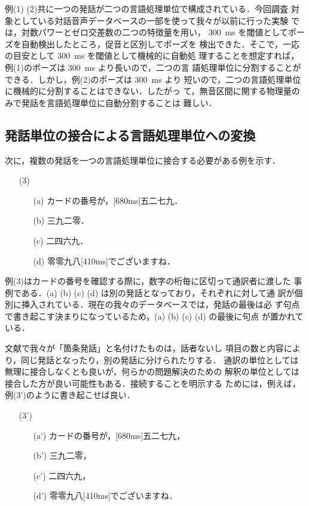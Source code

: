 例(1) (2)共に一つの発話が二つの言語処理単位で構成されている．今回調査
対象としている対話音声データベースの一部を使って我々が以前に行った実験
\cite{Takezawa96}では，対数パワーとゼロ交差数の二つの特徴量を用い，
300~ms を閾値としてポーズを自動検出したところ，促音と区別してポーズを
検出できた．そこで，一応の目安として 300~ms を閾値として機械的に自動処
理することを想定すれば，例(1)のポーズは 300~ms より長いので，二つの言
語処理単位に分割することができる．しかし，例(2)のポーズは 300~ms より
短いので，二つの言語処理単位に機械的に分割することはできない．したがっ
て，無音区間に関する物理量のみで発話を言語処理単位に自動分割することは
難しい．

\subsection{発話単位の接合による言語処理単位への変換}

次に，複数の発話を一つの言語処理単位に接合する必要がある例を示す．

\begin{itemize}
\item[(3)] 
\begin{itemize}
\item[(a)] カードの番号が，[680ms]五二七九．
\item[(b)] 三九二零．
\item[(c)] 二四六九．
\item[(d)] 零零九八[410ms]でございますね．
\end{itemize}
\end{itemize}

例(3)はカードの番号を確認する際に，数字の桁毎に区切って通訳者に渡した
事例である．(a) (b) (c) (d) は別の発話となっており，それぞれに対して通
訳が個別に挿入されている．現在の我々のデータベースでは，発話の最後は必
ず句点で書き起こす決まりになっているため，(a) (b) (c) (d) の最後に句点
が置かれている．

文献\cite{Takezawa95}で我々が「箇条発話」と名付けたものは，話者ないし
項目の数と内容により，同じ発話となったり，別の発話に分けられたりする．
通訳の単位としては無理に接合しなくとも良いが，何らかの問題解決のための
解釈の単位としては接合した方が良い可能性もある．接続することを明示する
ためには，例えば，例(3')のように書き起こせば良い．

\begin{itemize}
\item[(3')] 
\begin{itemize}
\item[(a')] カードの番号が，[680ms]五二七九，
\item[(b')] 三九二零，
\item[(c')] 二四六九，
\item[(d')] 零零九八[410ms]でございますね．
\end{itemize}
\end{itemize}

